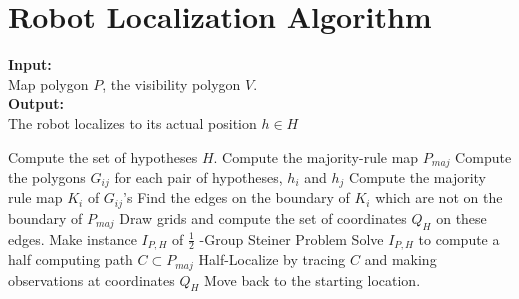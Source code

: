 \chapter{Robot Localization Algorithm}
\ifpdf
    \graphicspath{{Introduction/IntroductionFigs/PNG/}{Introduction/IntroductionFigs/PDF/}{Introduction/IntroductionFigs/}}
\else
    \graphicspath{{Introduction/IntroductionFigs/EPS/}{Introduction/IntroductionFigs/}}
\fi



{\bf Input:}\\
Map polygon $P$, the visibility polygon $V$.
\\
{\bf Output:}\\
The robot localizes to its actual position $h \in H$
\\
\begin{algorithmic}[1]
  \STATE Compute the set of hypotheses $H$.
  \STATE Compute the majority-rule map $P_{maj}$
  \STATE Compute the polygons $G_{ij}$ for each pair of hypotheses, $h_{i}$ and $h_{j}$
  \STATE Compute the majority rule map $K_{i}$ of $G_{ij}$'s
  \STATE Find the edges on the boundary of $K_{i}$ which are not on the boundary of $P_{maj}$
  \STATE Draw grids and compute the set of coordinates $Q_{H}$ on these edges.
  \STATE Make instance $I_{P,H}$  of $\frac{1}{2}$ -Group Steiner Problem
  \STATE Solve $I_{P,H}$ to compute a half computing path $C \subset P_{maj}$
  \STATE Half-Localize by tracing $C $ and making observations at coordinates $Q_{H}$
  \STATE Move back to the starting location.
 \ENDWHILE
\end{algorithmic}





